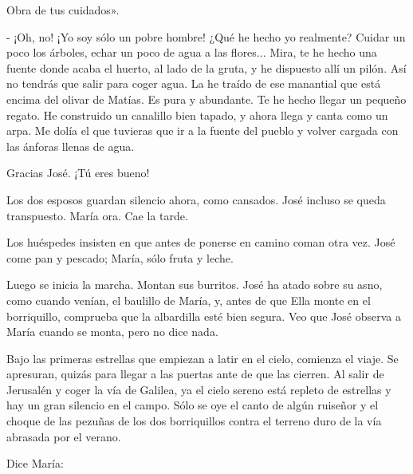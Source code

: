 \documentclass[12pt]{book} %
\begin{document}
Obra de tus cuidados». 

- ¡Oh, no! ¡Yo soy sólo un pobre hombre! ¿Qué he hecho yo realmente? Cuidar un poco los árboles, echar un poco de agua a las flores... Mira, te he hecho una fuente donde acaba el huerto, al lado de la gruta, y he dispuesto allí un pilón. Así no tendrás que salir para coger agua. La he traído de ese manantial que está encima del olivar de Matías. Es pura y abundante. Te he hecho llegar un pequeño regato. He construido un canalillo bien tapado, y ahora llega y canta como un arpa. Me dolía el que tuvieras que ir a la fuente del pueblo y volver cargada con las ánforas llenas de agua. 

Gracias José. ¡Tú eres bueno! 

Los dos esposos guardan silencio ahora, como cansados. José incluso se queda transpuesto. María ora. Cae la tarde. 

Los huéspedes insisten en que antes de ponerse en camino coman otra vez. José come pan y pescado; María, sólo fruta y leche. 

Luego se inicia la marcha. Montan sus burritos. José ha atado sobre su asno, como cuando venían, el baulillo de María, y, antes de que Ella monte en el borriquillo, comprueba que la albardilla esté bien segura. Veo que José observa a María cuando se monta, pero no dice nada. 

Bajo las primeras estrellas que empiezan a latir en el cielo, comienza el viaje. Se apresuran, quizás para llegar a las puertas ante de que las cierren. Al salir de Jerusalén y coger la vía de Galilea, ya el cielo sereno está repleto de estrellas y hay un gran silencio en el campo. Sólo se oye el canto de algún ruiseñor y el choque de las pezuñas de los dos borriquillos contra el terreno duro de la vía abrasada por el verano. 

Dice María: 
\end{document}
